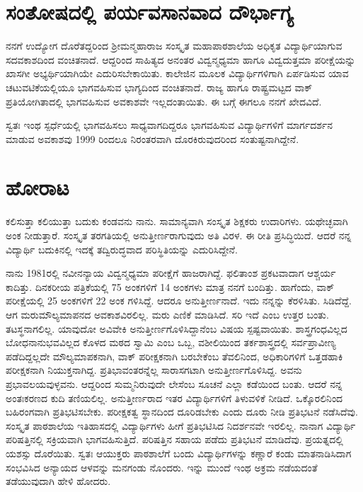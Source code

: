 {\section*{ಸಂತೋಷದಲ್ಲಿ ಪರ್ಯವಸಾನವಾದ ದೌರ್ಭಾಗ್ಯ}

ನನಗೆ ಉದ್ಯೋಗ ದೊರೆತದ್ದರಿಂದ ಶ್ರೀಮನ್ಮಹಾರಾಜ ಸಂಸ್ಕೃತ ಮಹಾಪಾಠಶಾಲೆಯ ಅಧಿಕೃತ ವಿದ್ಯಾರ್ಥಿಯಾಗುವ ಸದವಕಾಶದಿಂದ ವಂಚಿತನಾದೆ. ಆದ್ದರಿಂದ ಸಾಹಿತ್ಯದ ಅನಂತರ ವಿದ್ವನ್ಮಧ್ಯಮಾ ಹಾಗೂ ವಿದ್ವದುತ್ತಮಾ ಪರೀಕ್ಷೆಯನ್ನು ಖಾಸಗೀ ಅಭ್ಯರ್ಥಿಯಾಗಿಯೇ ಎದುರಿಸಬೇಕಾಯಿತು.  ಕಾಲೇಜಿನ ಮೂಲಕ ವಿದ್ಯಾರ್ಥಿಗಳಿಗಾಗಿ ಏರ್ಪಡಿಸುವ ಯಾವ ಚಟುವಟಿಕೆಯಲ್ಲಿಯೂ ಭಾಗವಹಿಸುವ ಭಾಗ್ಯದಿಂದ ವಂಚಿತನಾದೆ.  ರಾಜ್ಯ ಹಾಗೂ ರಾಷ್ಟ್ರಮಟ್ಟದ ವಾಕ್ ಪ್ರತಿಯೋಗಿತಾದಲ್ಲಿ ಭಾಗವಹಿಸುವ ಅವಕಾಶವೇ ಇಲ್ಲದಂತಾಯಿತು.  ಈ ಬಗ್ಗೆ ಈಗಲೂ ನನಗೆ ಖೇದವಿದೆ.  

ಸ್ವತಃ ಇಂಥ ಸ್ಪರ್ಧೆಯಲ್ಲಿ ಭಾಗವಹಿಸಲು ಸಾಧ್ಯವಾಗದಿದ್ದರೂ ಭಾಗವಹಿಸುವ ವಿದ್ಯಾರ್ಥಿಗಳಿಗೆ ಮಾರ್ಗದರ್ಶನ ಮಾಡುವ ಅವಕಾಶವು 1999 ರಿಂದಲೂ ನಿರಂತರವಾಗಿ ದೊರಕಿರುವುದರಿಂದ ಸಂತುಷ್ಟನಾಗಿದ್ದೇನೆ. 

\section*{ಹೋರಾಟ}

ಕಲಿಸುತ್ತಾ ಕಲಿಯುತ್ತಾ ಬದುಕು ಕಂಡವನು ನಾನು. ಸಾಮಾನ್ಯವಾಗಿ ಸಂಸ್ಕೃತ ಶಿಕ್ಷಕರು ಉದಾರಿಗಳು.  ಯಥೇಚ್ಛವಾಗಿ ಅಂಕ ನೀಡುತ್ತಾರೆ.  ಸಂಸ್ಕೃತ ತರಗತಿಯಲ್ಲಿ ಅನುತ್ತೀರ್ಣರಾಗುವುದು ಅತಿ ವಿರಳ. ಈ ರೀತಿ ಪ್ರಸಿದ್ಧಿಯಿದೆ. ಆದರೆ ನನ್ನ ವಿದ್ಯಾರ್ಥಿ ಬದುಕಿನಲ್ಲಿ ಇದಕ್ಕೆ ತದ್ವಿರುದ್ಧವಾದ ಪರಿಸ್ಥಿತಿಯನ್ನು ಎದುರಿಸಿದ್ದೇನೆ.  

ನಾನು 1981ರಲ್ಲಿ ನವೀನನ್ಯಾಯ ವಿದ್ವನ್ಮಧ್ಯಮಾ ಪರೀಕ್ಷೆಗೆ ಹಾಜರಾಗಿದ್ದೆ.  ಫಲಿತಾಂಶ ಪ್ರಕಟವಾದಾಗ ಆಶ್ಚರ್ಯ ಕಾದಿತ್ತು.  ದಿನಕರೀಯ ಪತ್ರಿಕೆಯಲ್ಲಿ 75 ಅಂಕಗಳಿಗೆ 14 ಅಂಕಗಳು ಮಾತ್ರ ನನಗೆ ಬಂದಿತ್ತು. ಹಾಗೆಂದು, ವಾಕ್ ಪರೀಕ್ಷೆಯಲ್ಲಿ 25 ಅಂಕ\-ಗಳಿಗೆ 22 ಅಂಕ ಗಳಿಸಿದ್ದೆ.  ಆದರೂ ಅನುತ್ತೀರ್ಣನಾದೆ.  ಇದು ನನ್ನನ್ನು ಕೆರಳಿಸಿತು.  ಸಿಡಿದೆದ್ದೆ. ಆಗ ಮರುಮೌಲ್ಯಮಾಪನದ ಅವಕಾಶವಿರಲಿಲ್ಲ.  ಮರು ಎಣಿಕೆ ಮಾಡಿಸಿದೆ.  ಸರಿ ಇದೆ ಎಂಬ ಉತ್ತರ ಬಂತು.  ತಟಸ್ಥನಾಗಲಿಲ್ಲ.  ಯಾವುದೋ ಅವಿವೇಕಿ ಅನುತ್ತೀರ್ಣ\-ಗೊಳಿಸಿದ್ದಾನೆಂಬ  ವಿಷಯ ಸ್ಪಷ್ಟವಾಯಿತು.  ಶಾಸ್ತ್ರಗಂಧವಿಲ್ಲದ ಬೋಧನಾನುಭವ\-ವಿಲ್ಲದ ಕೊಳದ ಮಠದ ಸ್ವಾಮಿ ಎಂಬ ಒಬ್ಬ, ವಶೀಲಿಯಿಂದ ತರ್ಕಶಾಸ್ತ್ರದಲ್ಲಿ ಸರ್ವ\-ಪ್ರಾವೀಣ್ಯ ಪಡೆದಿದ್ದಲ್ಲದೇ ಮೌಲ್ಯಮಾಪಕನಾಗಿ, ವಾಕ್ ಪರೀಕ್ಷಕನಾಗಿ ಬರಬೇಕೆಂಬ ತೆವಲಿನಿಂದ, ಅಧಿಕಾರಿಗಳಿಗೆ ಒತ್ತಡಹಾಕಿ ಪರೀಕ್ಷಕನಾಗಿ ನಿಯುಕ್ತನಾಗಿದ್ದ.  ಪ್ರತಿಭಾವಂತರನ್ನೆಲ್ಲ ಸಾರಾಸಗಟಾಗಿ ಅನುತ್ತೀರ್ಣಗೊಳಿಸಿದ್ದ.  ಅವನು ಪ್ರಭಾವಲಯವುಳ್ಳವನು.  ಆದ್ದರಿಂದ ಸುಮ್ಮನಿರುವುದೇ ಲೇಸೆಂಬ ಸೂಚನೆ ಎಲ್ಲಾ ಕಡೆಯಿಂದ ಬಂತು.  ಆದರೆ ನನ್ನ ಅಂತಃಕರಣದ ಕುದಿ ತಣಿಯಲಿಲ್ಲ.  ಅನುತ್ತೀರ್ಣರಾದ ಇತರ ವಿದ್ಯಾರ್ಥಿಗಳಿಗೆ ತಿಳುವಳಿಕೆ ನೀಡಿದೆ.  ಒಕ್ಕೊರಲಿನಿಂದ ಬಹಿರಂಗವಾಗಿ ಪ್ರತಿಭಟಿಸಬೇಕು. ಪರೀಕ್ಷಕತ್ವ ಸ್ಥಾನದಿಂದ ದೂರಿಡಬೇಕು ಎಂದು ದೂರು ನೀಡಿ ಪ್ರತಿಭಟನೆ ನಡೆಸಿದೆವು.  ಸಂಸ್ಕೃತ ಪಾಠಶಾಲೆಯ ಇತಿಹಾಸದಲ್ಲಿ ವಿದ್ಯಾರ್ಥಿಗಳು ಹೀಗೆ ಪ್ರತಿಭಟಿಸಿದ ನಿದರ್ಶನವೇ ಇರಲಿಲ್ಲ.  ನಾನಾಗ ವಿದ್ಯಾರ್ಥಿ ಪರಿಷತ್ತಿನಲ್ಲಿ ಸಕ್ರಿಯವಾಗಿ ಭಾಗವಹಿಸುತ್ತಿದೆ.  ಪರಿಷತ್ತಿನ ಸಹಾಯ ಪಡೆದು ಪ್ರತಿಭಟನೆ ಮಾಡಿದೆವು.  ಪ್ರಯತ್ನದಲ್ಲಿ ಯಶಸ್ಸು ದೊರೆಯಿತು.  ಸ್ವತಃ ಆಯುಕ್ತರು ಪಾಠಶಾಲೆಗೆ ಬಂದು ವಿದ್ಯಾರ್ಥಿಗಳನ್ನು ಕಣ್ಣಾರೆ ಕಂಡು ಮಾತನಾಡಿಸಿದಾಗ ಸಂಭವಿ\-ಸಿದ ಅನ್ಯಾಯದ ಆಳವನ್ನು ಮನಗಂಡು ನೊಂದರು.  ಇನ್ನು ಮುಂದೆ ಇಂಥ ಅಕ್ರಮ ನಡೆಯದಂತೆ ತಡೆಯುವುದಾಗಿ ಹೇಳಿ ಹೋದರು.  

}
